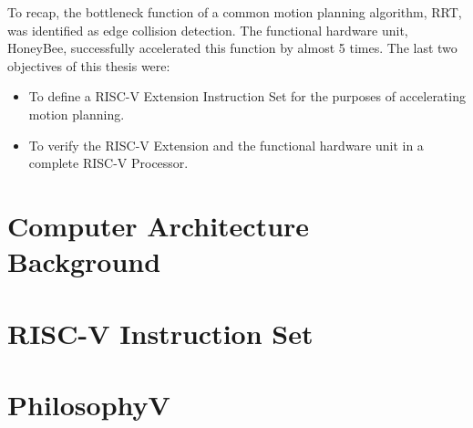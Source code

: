 
To recap, the bottleneck function of a common motion planning algorithm, \gls{RRT}, was identified as edge collision detection. The functional hardware unit, HoneyBee, successfully accelerated this function by almost 5 times. The last two objectives of this thesis were:
    \begin{itemize}
    \item To define a RISC-V Extension Instruction Set for the purposes of accelerating motion planning.
    \item To verify the RISC-V Extension and the functional hardware unit in a complete RISC-V Processor.
    \end{itemize}

\section{Computer Architecture Background}
    

\newpage
\section{RISC-V Instruction Set}
    

\newpage
\section{PhilosophyV}
    